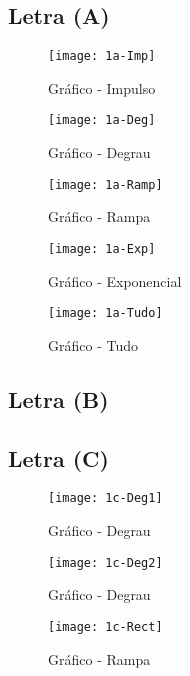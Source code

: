 \documentclass[12pt,a4paper]{article}
\begin{document}
	\subsection{Letra (A)}
			\begin{figure}[!ht]
				\centering
				\texttt{[image: 1a-Imp]}
				\caption{Gráfico - Impulso}
			\end{figure}
			\newpage

			\begin{figure}[!ht]
				\centering
				\texttt{[image: 1a-Deg]}
				\caption{Gráfico - Degrau}
			\end{figure}

			\begin{figure}[!ht]
				\centering
				\texttt{[image: 1a-Ramp]}
				\caption{Gráfico - Rampa}
			\end{figure}
			\newpage

			\begin{figure}[!ht]
				\centering
				\texttt{[image: 1a-Exp]}
				\caption{Gráfico - Exponencial}
			\end{figure}

			\begin{figure}[!ht]
				\centering
				\texttt{[image: 1a-Tudo]}
				\caption{Gráfico - Tudo}
			\end{figure}
			\newpage
	
	\subsection{Letra (B)}
	
	\subsection{Letra (C)}
			\begin{figure}[!ht]
				\centering
				\texttt{[image: 1c-Deg1]}
				\caption{Gráfico - Degrau}
			\end{figure}

			\begin{figure}[!ht]
				\centering
				\texttt{[image: 1c-Deg2]}
				\caption{Gráfico - Degrau}
			\end{figure}

			\begin{figure}[!ht]
				\centering
				\texttt{[image: 1c-Rect]}
				\caption{Gráfico - Rampa}
			\end{figure}
	
\end{document}
